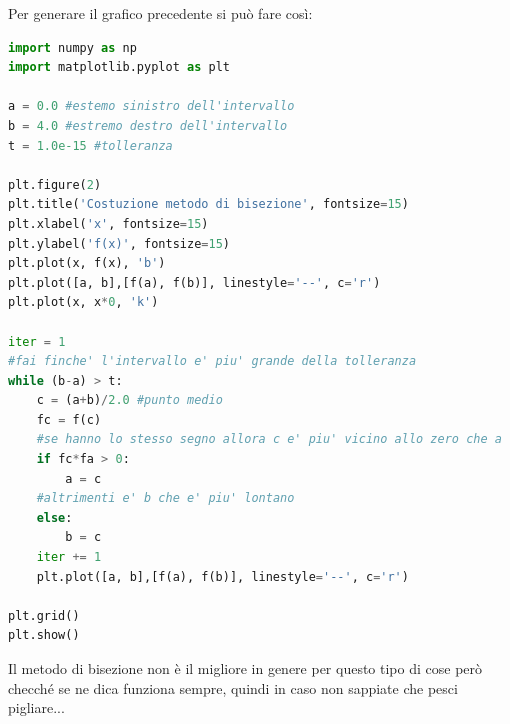 \documentclass[10pt,a4paper]{article}
\begin{document}
\begin{center}
\end{center}

Per generare il grafico precedente si può fare così:

\begin{lstlisting}[language=Python]
import numpy as np
import matplotlib.pyplot as plt

a = 0.0 #estemo sinistro dell'intervallo
b = 4.0 #estremo destro dell'intervallo
t = 1.0e-15 #tolleranza

plt.figure(2)
plt.title('Costuzione metodo di bisezione', fontsize=15)
plt.xlabel('x', fontsize=15)
plt.ylabel('f(x)', fontsize=15)
plt.plot(x, f(x), 'b')
plt.plot([a, b],[f(a), f(b)], linestyle='--', c='r')
plt.plot(x, x*0, 'k')

iter = 1
#fai finche' l'intervallo e' piu' grande della tolleranza
while (b-a) > t:
    c = (a+b)/2.0 #punto medio
    fc = f(c)
    #se hanno lo stesso segno allora c e' piu' vicino allo zero che a
    if fc*fa > 0:
        a = c
    #altrimenti e' b che e' piu' lontano
    else:
        b = c
    iter += 1
    plt.plot([a, b],[f(a), f(b)], linestyle='--', c='r')

plt.grid()
plt.show()
\end{lstlisting}


Il metodo di bisezione non è il migliore in genere per questo tipo di cose però checché se ne dica funziona sempre, quindi in caso non sappiate che pesci pigliare...
\end{document}
